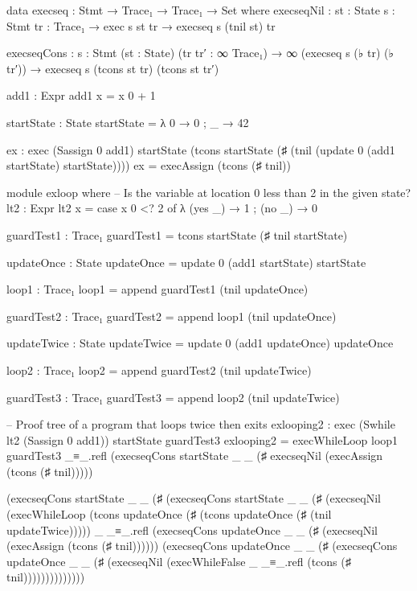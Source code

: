         data execseq : Stmt → Trace₁ → Trace₁ → Set where
            execseqNil : {st : State} {s : Stmt} {tr : Trace₁} 
                → exec s st tr 
                → execseq s (tnil st) tr
                
            execseqCons : {s : Stmt} (st : State) (tr tr′ : ∞ Trace₁) 
                → ∞ (execseq s (♭ tr) (♭ tr′)) 
                → execseq s (tcons st tr) (tcons st tr′)

    add1 : Expr
    add1 x = x 0 + 1

    startState : State
    startState = λ {0 → 0 ; _ → 42}

    ex : exec (Sassign 0 add1) startState (tcons startState (♯ (tnil (update 0 (add1 startState) startState))))
    ex = execAssign (tcons (♯ tnil))

    module exloop where
        -- Is the variable at location 0 less than 2 in the given state?
        lt2 : Expr
        lt2 x  = case x 0 <? 2 of λ {(yes _) → 1 ; (no _) → 0}

        guardTest1 : Trace₁
        guardTest1 = tcons startState (♯ tnil startState)

        updateOnce : State
        updateOnce = update 0 (add1 startState) startState

        loop1 : Trace₁
        loop1 = append guardTest1 (tnil updateOnce)

        guardTest2 : Trace₁
        guardTest2 = append loop1 (tnil updateOnce)

        updateTwice : State
        updateTwice = update 0 (add1 updateOnce) updateOnce

        loop2 : Trace₁
        loop2 = append guardTest2 (tnil updateTwice)

        guardTest3 : Trace₁
        guardTest3 = append loop2 (tnil updateTwice)

        -- Proof tree of a program that loops twice then exits
        exlooping2 : exec (Swhile lt2 (Sassign 0 add1)) startState guardTest3
        exlooping2 = execWhileLoop
            loop1 
            guardTest3 
            _≡_.refl 
            (execseqCons 
                startState 
                _ 
                _ 
                (♯ execseqNil (execAssign (tcons (♯ tnil))))) 

            (execseqCons 
                startState 
                _ 
                _ 
                (♯ (execseqCons 
                    startState 
                    _ 
                    _ 
                    (♯ (execseqNil 
                        (execWhileLoop 
                            (tcons updateOnce (♯ (tcons updateOnce (♯ (tnil updateTwice)))))
                            _ 
                            _≡_.refl 
                            (execseqCons updateOnce _ _ (♯ (execseqNil (execAssign (tcons (♯ tnil))))))
                            (execseqCons updateOnce _ _ (♯ (execseqCons updateOnce _ _ (♯ (execseqNil
                                (execWhileFalse
                                _ 
                                _≡_.refl 
                                (tcons (♯ tnil))))))))))))))

